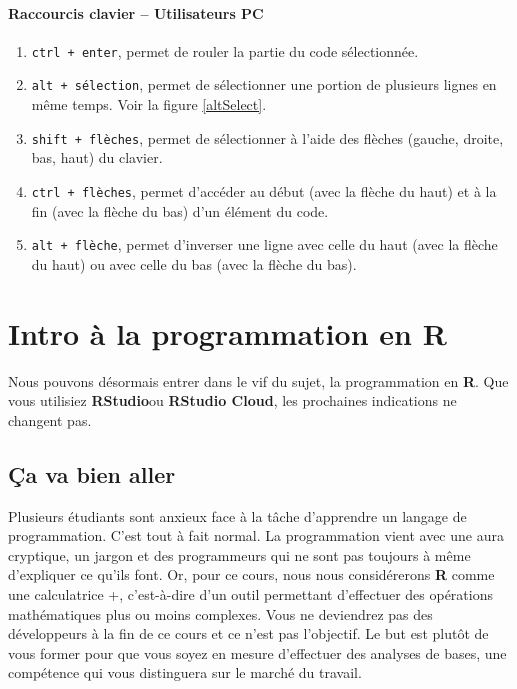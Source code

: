 \documentclass[10.5pt,a4paper]{article}
\begin{document}
      \paragraph{Raccourcis clavier -- Utilisateurs PC}
      \begin{enumerate}
        \item \texttt{ctrl + enter}, permet de rouler la partie du code sélectionnée.
        \item \texttt{alt + sélection}, permet de sélectionner une portion de plusieurs lignes en même temps. Voir la figure \ref{altSelect}.
        \item \texttt{shift + flèches}, permet de sélectionner à l'aide des flèches (gauche, droite, bas, haut) du clavier.
        \item \texttt{ctrl + flèches}, permet d'accéder au début (avec la flèche du haut) et à la fin (avec la flèche du bas) d'un élément du code.
        \item \texttt{alt + flèche}, permet d'inverser une ligne avec celle du haut (avec la flèche du haut) ou avec celle du bas (avec la flèche du bas).
      \end{enumerate}

\section{Intro à la programmation en R}
Nous pouvons désormais entrer dans le vif du sujet, la programmation en \textbf{R}. Que vous utilisiez \textbf{RStudio}ou \textbf{RStudio Cloud}, les prochaines indications ne changent pas. 

  \subsection{Ça va bien aller}
  Plusieurs étudiants sont anxieux face à la tâche d'apprendre un langage de programmation. C'est tout à fait normal. La programmation vient avec une aura cryptique, un jargon et des programmeurs qui ne sont pas toujours à même d'expliquer ce qu'ils font. Or, pour ce cours, nous nous considérerons \textbf{R} comme une calculatrice +, c'est-à-dire d'un outil permettant d'effectuer des opérations mathématiques plus ou moins complexes. Vous ne deviendrez pas des développeurs à la fin de ce cours et ce n'est pas l'objectif. Le but est plutôt de vous former pour que vous soyez en mesure d'effectuer des analyses de bases, une compétence qui vous distinguera sur le marché du travail.
\end{document}
